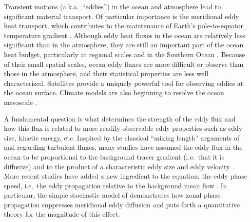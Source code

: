 \documentclass[10pt]{article}
\begin{document}
Transient motions (a.k.a.~``eddies'') in the ocean and atmosphere lead to significant material transport. Of particular importance is the meridional eddy heat transport, which contributes to the maintenance of Earth's pole-to-equator temperature gradient \citep{TrenberthCaron2001,Wunsch2005}. Although eddy heat fluxes in the ocean are relatively less significant than in the atmosphere, they are still an important part of the ocean heat budget, particularly at regional scales and in the Southern Ocean \citep{JayneMarotzke2002,VolkovEtAl2008,AbernatheyCessi2014}. Because of their small spatial scales, ocean eddy fluxes are more difficult or observe than those in the atmosphere, and their statistical properties are less well characterized. Satellites provide a uniquely powerful tool for observing eddies at the ocean surface. Climate models are also beginning to resolve the ocean mesoscale \citep{MccleanEtAl2011}.

A fundamental question is what determines the strength of the eddy flux and how this flux is related to more readily observable eddy properties such as eddy size, kinetic energy, etc.
Inspired by the classical ``mixing length'' arguments of \citet{Taylor1915} and \citet{Prandtl1925} regarding turbulent fluxes, many studies have assumed the eddy flux in the ocean to be proportional to the background tracer gradient (i.e.~that it is diffusive) and to the product of a characteristic eddy size and eddy velocity \citep[e.g.][]{Holloway1986,KefferHolloway1988,HeldLarichev1996,VisbeckEtAl1997,Stammer1998}. More recent studies have added a new ingredient to the equation: the eddy phase speed, i.e.~the eddy propagation relative to the background mean flow \citep{MarshallEtAl2006,SmithMarshall2009,AbernatheyEtAl2010,FerrariNikurashin2010,KlockerEtAl2012a,KlockerEtAl2012b,AbernatheyMarshall2013}. In particular, the simple stochastic model of \citet{FerrariNikurashin2010} demonstrates how zonal phase propagation suppresses meridional eddy diffusion and puts forth a quantitative theory for the magnitude of this effect.
\end{document}
